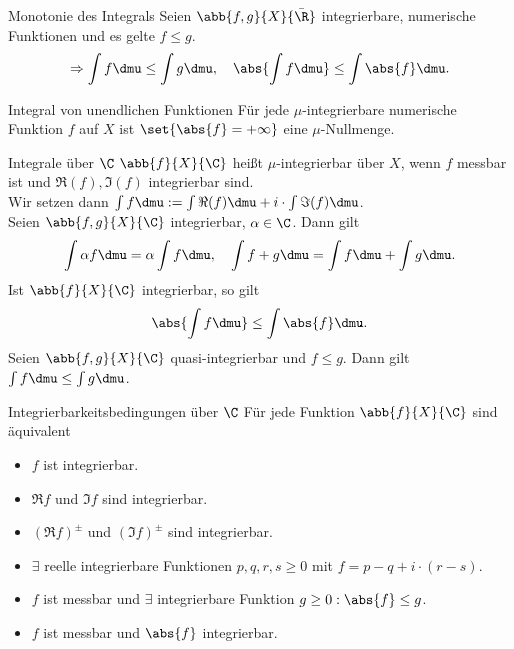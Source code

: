 \begin{karte}{Monotonie des Integrals}
	Seien \( \abb{f,g}{X}{\bar{\R}} \) integrierbare, 
	numerische Funktionen und es gelte \( f \leq g \).
	\[ \Rightarrow \int f \dmu \leq \int g \dmu, \quad 
	\abs{\int f \dmu} \leq \int \abs{f}\dmu. \]
\end{karte}

\begin{karte}{Integral von unendlichen Funktionen}
	Für jede \( \mu \)-integrierbare numerische Funktion \( f \) auf \(X\) ist 
	\( \set{\abs{f} = +\infty} \) eine \(\mu\)-Nullmenge.
\end{karte}

\begin{karte}{Integrale über \( \C\)}
	\( \abb{f}{X}{\C} \) heißt \( \mu \)-integrierbar über \( X \), wenn \( f \) messbar ist und 
	\( \Re(f), \Im(f) \) integrierbar sind. \\
	Wir setzen dann \( \int f \dmu := \int \Re(f) \dmu + i \cdot \int \Im(f) \dmu \).\\
	Seien \( \abb{f,g}{X}{\C} \) integrierbar, \(\alpha \in \C\). Dann gilt 
	\[ \int \alpha f \dmu = \alpha \int f\dmu, \quad 
	\int f + g \dmu = \int f \dmu + \int g \dmu. \]
	Ist \(\abb{f}{X}{\C}\) integrierbar, so gilt 
	\[ \abs{ \int f \dmu } \leq \int \abs{f} \dmu. \]
	Seien \( \abb{f,g}{X}{\C} \) quasi-integrierbar und \( f \leq g \). 
	Dann gilt \( \int f \dmu \leq \int g \dmu \).
\end{karte}

\begin{karte}{Integrierbarkeitsbedingungen über \( \C\)}
	Für jede Funktion \( \abb{f}{X}{\C} \) sind äquivalent 
	\begin{itemize}
		\item \(f\) ist integrierbar.
		\item \( \Re f \) und \(\Im f\) sind integrierbar.
		\item \( (\Re f)^\pm \) und \( (\Im f)^\pm \) sind integrierbar.
		\item \( \exists \) reelle integrierbare Funktionen 
		\(p,q,r,s \geq 0 \) mit \( f = p - q + i \cdot (r - s) \).
		\item \( f \) ist messbar und \( \exists \) integrierbare Funktion \( g \geq 0: \abs{f}\leq g \).
		\item \( f \) ist messbar und \( \abs{f} \) integrierbar.
	\end{itemize}
\end{karte}

